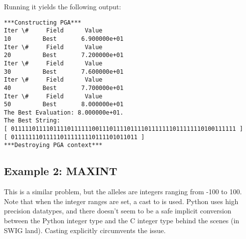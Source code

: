 \documentclass[letterpaper,11pt,english]{sphinxmanual}
\begin{document}
Running it yields the following output:

\begin{Verbatim}[commandchars=\\\{\}]
***Constructing PGA***
Iter \#     Field      Value
10         Best       6.900000e+01
Iter \#     Field      Value
20         Best       7.200000e+01
Iter \#     Field      Value
30         Best       7.600000e+01
Iter \#     Field      Value
40         Best       7.700000e+01
Iter \#     Field      Value
50         Best       8.000000e+01
The Best Evaluation: 8.000000e+01.
The Best String:
[ 0111110111101111011111100111011110111101111111011111110100111111 ]
[ 011111110111110111111110111101011011 ]
***Destroying PGA context***
\end{Verbatim}


\subsection{Example 2: MAXINT}
\label{examples:example-2-maxint}\label{examples:sec-maxintexample}
This is a similar problem, but the alleles are integers ranging
from -100 to 100.  Note that when the integer ranges are
set, a cast to  is used.  Python uses high precision
datatypes, and there doesn't seem to be a safe implicit conversion
between the Python integer type and the C integer type behind
the scenes (in SWIG land).  Casting
explicitly circumvents the issue.
\end{document}
